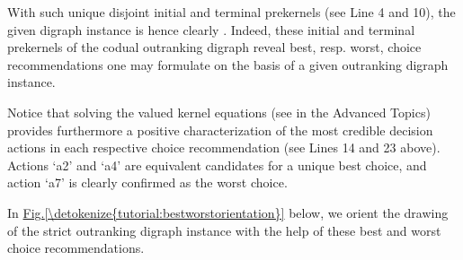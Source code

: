 \documentclass[a4paper,12pt,english]{sphinxhowto}
\begin{document}
With such unique disjoint initial and terminal prekernels (see Line 4 and 10), the given digraph instance is hence clearly . Indeed, these initial and terminal prekernels of the codual outranking digraph reveal best, resp. worst, choice recommendations one may formulate on the basis of a given outranking digraph instance.

\begin{sphinxVerbatim}[commandchars=\\\{\},numbers=left,firstnumber=1,stepnumber=1]
\end{sphinxVerbatim}

Notice that solving the valued  kernel equations (see  in the Advanced Topics) provides furthermore a positive characterization of the most credible decision actions in each respective choice recommendation (see Lines 14 and 23 above). Actions ‘a2’ and ‘a4’ are equivalent candidates for a unique best choice, and action ‘a7’ is clearly confirmed as the worst choice.

In \hyperref[\detokenize{tutorial:bestworstorientation}]{Fig.\@ \ref{\detokenize{tutorial:bestworstorientation}}} below, we orient the drawing of the strict outranking digraph instance with the help of these best and worst choice recommendations.
\end{document}
